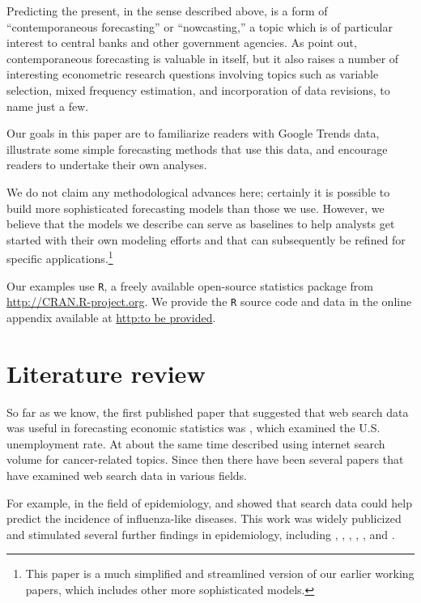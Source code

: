 \documentclass[12pt, oneside]{article}
\begin{document}
Predicting the present, in the sense described above, is a form of
``contemporaneous forecasting'' or ``nowcasting,'' a topic which is of
particular interest to central banks and other government agencies.
As \cite{Castle09} point out, contemporaneous forecasting is valuable
in itself, but it also raises a number of interesting econometric
research questions involving topics such as variable selection, mixed
frequency estimation, and incorporation of data revisions, to name
just a few.

Our goals in this paper are to familiarize readers with Google Trends
data, illustrate some simple forecasting methods that use this data,
and encourage readers to undertake their own analyses.

We do not claim any methodological advances here; certainly it is
possible to build more sophisticated forecasting models than those we
use.  However, we believe that the models we describe can serve as
baselines to help analysts get started with their own modeling efforts
and that can subsequently be refined for specific
applications.\footnote{This paper is a much simplified and streamlined
  version of our earlier working papers, \cite{Choi09a,Choi09b} which
  includes other more sophisticated models.}

Our examples use {\tt R}, a freely available open-source statistics
package from \url{http://CRAN.R-project.org}.  We provide the {\tt R}
source code and data in the online appendix available at \url{http:to
  be provided}.

\section{Literature review}

So far as we know, the first published paper that suggested that web
search data was useful in forecasting economic statistics was
\citet{Ettredge05}, which examined the U.S. unemployment rate.  At
about the same time \citet{Cooper05} described using internet search
volume for cancer-related topics.  Since then there have been several
papers that have examined web search data in various fields.

For example, in the field of epidemiology, \citet{Polgreen08} and
\citet{Ginsberg09} showed that search data could help predict the
incidence of influenza-like diseases.  This work was widely publicized
and stimulated several further findings in epidemiology, including
\citet{Brownstein09}, \citet{Corley09}, \citet{Hulth09},
\citet{Turbelin09}, \citet{Valdivia10}, and \citet{Wilson09}.
\end{document}
